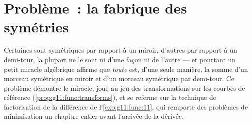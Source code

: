 \section{Problème~: la fabrique des symétries}

\begin{problem}
\label{pb:g11:func:1}
Certaines  sont symétriques par rapport à un miroir,
d'autres par rapport à un demi-tour, la plupart ne le sont ni d'une
façon ni de l'autre --- et pourtant un petit miracle algébrique
affirme que \emph{toute}  est, d'une seule manière, la somme
d'un morceau symétrique en miroir et d'un morceau symétrique par
demi-tour. Ce problème démontre le miracle, joue au jeu des
transformations sur les courbes de référence
(\cref{prop:g11:func:transforms}), et se referme sur la technique de
factorisation de la différence de l'\cref{exo:g11:func:11}, qui
remporte des problèmes de minimisation un chapitre entier avant
l'arrivée de la dérivée.


\end{problem}
